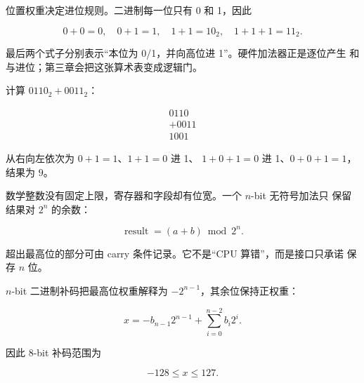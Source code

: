 位置权重决定进位规则。二进制每一位只有 0 和 1，因此

\[
0+0=0,\quad 0+1=1,\quad 1+1=10_2,\quad 1+1+1=11_2.
\]

最后两个式子分别表示“本位为 0/1，并向高位进 1”。硬件加法器正是逐位产生
和与进位；第三章会把这张算术表变成逻辑门。

\begin{workedexample}
计算 \(0110_2+0011_2\)：

\[
\begin{array}{r}
  0110\\
 +0011\\
 \hline
  1001
\end{array}
\]

从右向左依次为 \(0+1=1\)、\(1+1=0\) 进 1、
\(1+0+1=0\) 进 1、\(0+0+1=1\)，结果为 \(9\)。
\end{workedexample}

数学整数没有固定上限，寄存器和字段却有位宽。一个 \(n\)-bit 无符号加法只
保留结果对 \(2^n\) 的余数：

\[
\operatorname{result}=(a+b)\bmod 2^n.
\]

超出最高位的部分可由 carry 条件记录。它不是“CPU 算错”，而是接口只承诺
保存 \(n\) 位。

\begin{center}
\end{center}

\(n\)-bit 二进制补码把最高位权重解释为 \(-2^{n-1}\)，其余位保持正权重：

\[
x=-b_{n-1}2^{n-1}+\sum_{i=0}^{n-2}b_i2^i.
\]

因此 8-bit 补码范围为

\[
-128\le x\le127.
\]

